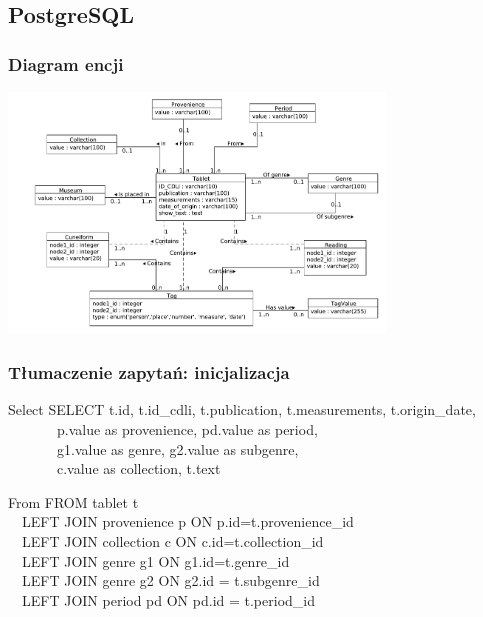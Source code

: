 \subsection{PostgreSQL}

\begin{frame}
 \frametitle{Diagram encji}
 \includegraphics[width=100mm]{../diagramy/diagram-encji-maly.pdf}
\end{frame}

\begin{frame}
 \frametitle{Tłumaczenie zapytań: inicjalizacja}
 \begin{block}{Select}
SELECT t.id, t.id\_cdli, t.publication, t.measurements, t.origin\_date, \\
~~~~~~~p.value as provenience, pd.value as period, \\
~~~~~~~g1.value as genre, g2.value as subgenre, \\
~~~~~~~c.value as collection, t.text 
 \end{block}
\begin{block}{From}
FROM tablet t \\
~~LEFT JOIN provenience p ON p.id=t.provenience\_id \\
~~LEFT JOIN collection c ON c.id=t.collection\_id \\
~~LEFT JOIN genre g1 ON g1.id=t.genre\_id \\
~~LEFT JOIN genre g2 ON g2.id = t.subgenre\_id \\
~~LEFT JOIN period pd ON pd.id = t.period\_id \\
\end{block}

\end{frame}

